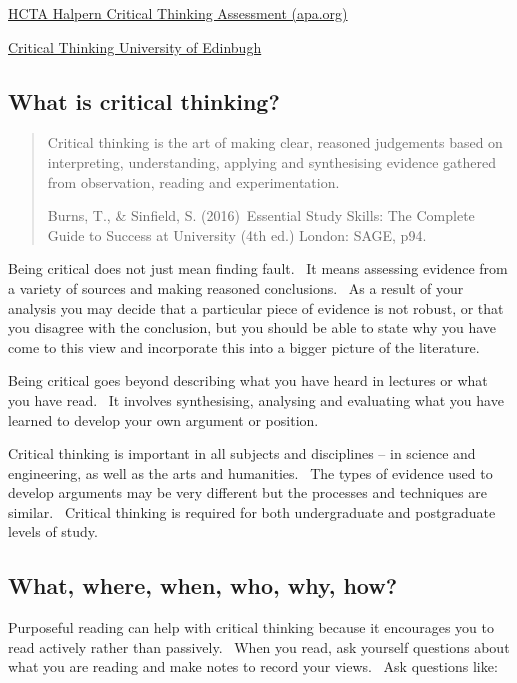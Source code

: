 \documentclass[
  letterpaper,
  DIV=11,
  numbers=noendperiod,
  oneside]{scrreprt}
\begin{document}
\href{https://psycnet.apa.org/doiLanding?doi=10.1037\%2Ft10940-000}{HCTA
Halpern Critical Thinking Assessment (apa.org)}

\href{https://www.ed.ac.uk/institute-academic-development/study-hub/learning-resources/critical}{Critical
Thinking University of Edinbugh}

\hypertarget{what-is-critical-thinking}{%
\subsection{What is critical
thinking?}\label{what-is-critical-thinking}}

\begin{quote}
Critical thinking is the art of making clear, reasoned judgements based
on interpreting, understanding, applying and synthesising evidence
gathered from observation, reading and experimentation.

Burns, T., \& Sinfield, S. (2016)~Essential Study Skills: The Complete
Guide to Success at University (4th ed.) London: SAGE, p94.
\end{quote}

Being critical does not just mean finding fault.~ It means assessing
evidence from a variety of sources and making reasoned conclusions.~ As
a result of your analysis you may decide that a particular piece of
evidence is not robust, or that you disagree with the conclusion, but
you should be able to state why you have come to this view and
incorporate this into a bigger picture of the literature.

Being critical goes beyond describing what you have heard in lectures or
what you have read.~ It involves synthesising, analysing and evaluating
what you have learned to develop your own argument or position.

Critical thinking is important in all subjects and disciplines -- in
science and engineering, as well as the arts and humanities.~ The types
of evidence used to develop arguments may be very different but the
processes and techniques are similar.~ Critical thinking is required for
both undergraduate and postgraduate levels of study.

\hypertarget{what-where-when-who-why-how}{%
\subsection{What, where, when, who, why,
how?}\label{what-where-when-who-why-how}}

Purposeful reading can help with critical thinking because it encourages
you to read actively rather than passively.~ When you read, ask yourself
questions about what you are reading and make notes to record your
views.~ Ask questions like:
\end{document}
